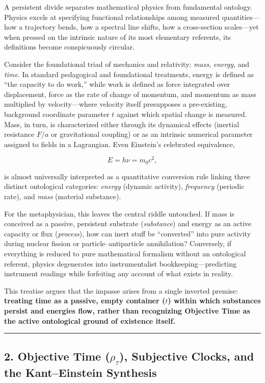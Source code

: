 \documentclass[
]{article}
\begin{document}
A persistent divide separates mathematical physics from fundamental
ontology. Physics excels at specifying functional relationships among
measured quantities---how a trajectory bends, how a spectral line
shifts, how a cross-section scales---yet when pressed on the intrinsic
nature of its most elementary referents, its definitions become
conspicuously circular.

Consider the foundational triad of mechanics and relativity:
\emph{mass}, \emph{energy}, and \emph{time}. In standard pedagogical and
foundational treatments, energy is defined as ``the capacity to do
work,'' while work is defined as force integrated over displacement,
force as the rate of change of momentum, and momentum as mass multiplied
by velocity---where velocity itself presupposes a pre-existing,
background coordinate parameter \(t\) against which spatial change is
measured. Mass, in turn, is characterized either through its dynamical
effects (inertial resistance \(F/a\) or gravitational coupling) or as an
intrinsic numerical parameter assigned to fields in a Lagrangian. Even
Einstein's celebrated equivalence,

\[E = h\nu = m_0 c^2,\]

is almost universally interpreted as a quantitative conversion rule
linking three distinct ontological categories: \emph{energy} (dynamic
activity), \emph{frequency} (periodic rate), and \emph{mass} (material
substance).

For the metaphysician, this leaves the central riddle untouched. If mass
is conceived as a passive, persistent substrate (\emph{substance}) and
energy as an active capacity or flux (\emph{process}), how can inert
stuff be ``converted'' into pure activity during nuclear fission or
particle--antiparticle annihilation? Conversely, if everything is
reduced to pure mathematical formalism without an ontological referent,
physics degenerates into instrumentalist bookkeeping---predicting
instrument readings while forfeiting any account of what exists in
reality.

This treatise argues that the impasse arises from a single inverted
premise: \textbf{treating time as a passive, empty container (\(t\))
within which substances persist and energies flow, rather than
recognizing Objective Time as the active ontological ground of existence
itself.}

\begin{center}\rule{0.5\linewidth}{0.5pt}\end{center}

\subsection{\texorpdfstring{2. Objective Time (\(\rho_\tau\)),
Subjective Clocks, and the Kant--Einstein
Synthesis}{2. Objective Time (\textbackslash rho\_\textbackslash tau), Subjective Clocks, and the Kant--Einstein Synthesis}}\label{objective-time-rho_tau-subjective-clocks-and-the-kanteinstein-synthesis}
\end{document}
